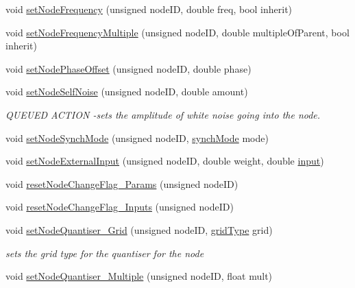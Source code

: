 \begin{DoxyCompactItemize}
void \mbox{\hyperlink{classMatsuokaEngine_acd76608c9b7fb30bf9e0ed2ecd1ba40a}{set\+Node\+Frequency}} (unsigned node\+ID, double freq, bool inherit)
\item 
void \mbox{\hyperlink{classMatsuokaEngine_a304bbae799a46734b1db0ac679f032e4}{set\+Node\+Frequency\+Multiple}} (unsigned node\+ID, double multiple\+Of\+Parent, bool inherit)
\item 
void \mbox{\hyperlink{classMatsuokaEngine_a858deaa3246c884cc0693b494e398849}{set\+Node\+Phase\+Offset}} (unsigned node\+ID, double phase)
\item 
void \mbox{\hyperlink{classMatsuokaEngine_a4e564e80779a3cd89cb3d4347920ba7d}{set\+Node\+Self\+Noise}} (unsigned node\+ID, double amount)
\begin{DoxyCompactList}\small\item\em Q\+U\+E\+U\+ED A\+C\+T\+I\+ON -\/sets the amplitude of white noise going into the node. \end{DoxyCompactList}\item 
void \mbox{\hyperlink{classMatsuokaEngine_aa037d1bcb48e395ef6e789feab20b144}{set\+Node\+Synch\+Mode}} (unsigned node\+ID, \mbox{\hyperlink{classMatsuNode_a725e228db39b8842f851ddf88f640bed}{synch\+Mode}} mode)
\item 
void \mbox{\hyperlink{classMatsuokaEngine_a8eb38eaa5de05677243c5c7cd809af4d}{set\+Node\+External\+Input}} (unsigned node\+ID, double weight, double \mbox{\hyperlink{classMatsuokaEngine_a811a5449f07004a2eb6b34e8c9bd862f}{input}})
\item 
void \mbox{\hyperlink{classMatsuokaEngine_afc55b8350937748e0c0187a08130ca31}{reset\+Node\+Change\+Flag\+\_\+\+Params}} (unsigned node\+ID)
\item 
void \mbox{\hyperlink{classMatsuokaEngine_a19fd8a9446e6bea6986d8de5c5c7bfd1}{reset\+Node\+Change\+Flag\+\_\+\+Inputs}} (unsigned node\+ID)
\item 
void \mbox{\hyperlink{classMatsuokaEngine_aeb46c52bb2a430616aea63732aba7e32}{set\+Node\+Quantiser\+\_\+\+Grid}} (unsigned node\+ID, \mbox{\hyperlink{classQuantisedEventQueue_ae186d50bd503038452edbbdd0c7c259e}{grid\+Type}} grid)
\begin{DoxyCompactList}\small\item\em sets the grid type for the quantiser for the node \end{DoxyCompactList}\item 
void \mbox{\hyperlink{classMatsuokaEngine_a1220a5a72f9bf35a9e6cd5a4f999f7e5}{set\+Node\+Quantiser\+\_\+\+Multiple}} (unsigned node\+ID, float mult)

\end{DoxyCompactItemize}
